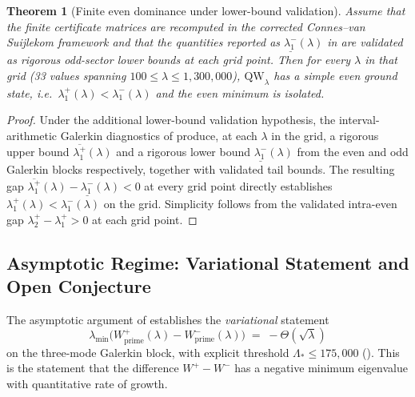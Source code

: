 \documentclass[11pt,a4paper]{article}
\newtheorem{theorem}{Theorem}[section]
\theoremstyle{remark}
\theoremstyle{plain}
\newcommand{\QW}{\mathrm{QW}}
\begin{document}
\begin{theorem}[Finite even dominance under lower-bound validation]
\label{thm:even-finite}
Assume that the finite certificate matrices are recomputed in the corrected
Connes--van Suijlekom framework and that the quantities reported as
$\underline{\lambda_1^-}(\lambda)$ in  are
validated as rigorous odd-sector lower bounds at each grid point.
Then for every $\lambda$ in that grid (33 values spanning
$100\leq\lambda\leq 1{,}300{,}000$), $\QW_\lambda$ has a simple even ground state,
i.e.\ $\lambda_1^+(\lambda)<\lambda_1^-(\lambda)$ and the even minimum is
isolated.
\end{theorem}

\begin{proof}
Under the additional lower-bound validation hypothesis, the interval-arithmetic
Galerkin diagnostics of  produce, at each
$\lambda$ in the grid, a rigorous upper bound
$\overline{\lambda_1^+}(\lambda)$ and a rigorous lower bound
$\underline{\lambda_1^-}(\lambda)$ from the even and odd Galerkin blocks
respectively, together with validated tail bounds. The resulting gap
$\overline{\lambda_1^+}(\lambda)-\underline{\lambda_1^-}(\lambda)<0$ at every
grid point directly establishes $\lambda_1^+(\lambda)<\lambda_1^-(\lambda)$ on
the grid. Simplicity follows from the validated intra-even gap
$\lambda_2^+-\lambda_1^+>0$ at each grid point.
\end{proof}

\subsection{Asymptotic Regime: Variational Statement and Open Conjecture}

The asymptotic argument of  establishes the
\emph{variational} statement
\begin{equation}\label{eq:variational-result}
  \lambda_{\min}\bigl(W^+_{\mathrm{prime}}(\lambda)-W^-_{\mathrm{prime}}(\lambda)\bigr)
  \;=\; -\Theta(\sqrt\lambda)
\end{equation}
on the three-mode Galerkin block, with explicit threshold
$\Lambda_*\leq 175{,}000$ ().
This is the statement that the difference $W^+-W^-$ has a negative minimum
eigenvalue with quantitative rate of growth.
\end{document}
